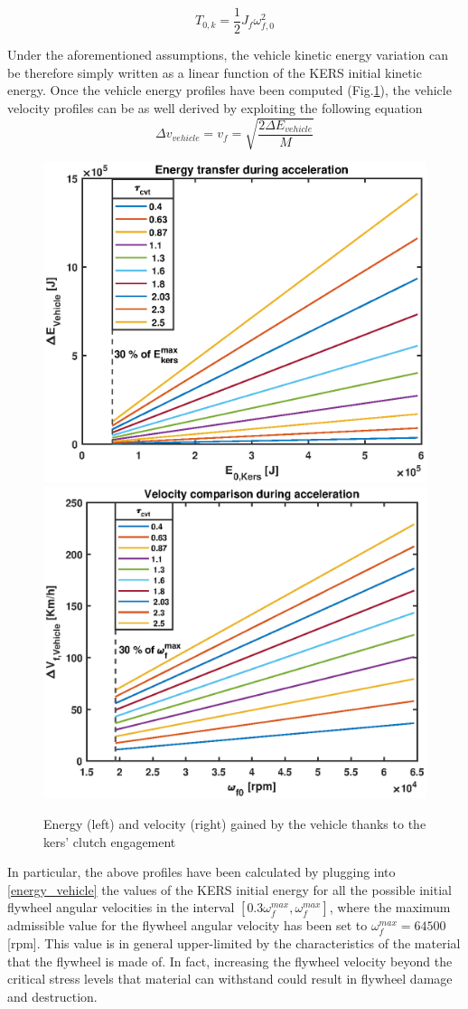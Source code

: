 \documentclass[11pt]{article}
\begin{document}
\begin{equation}
T_{0,k} = \frac{1}{2}J_f\omega_{f,0}^2
\end{equation}

Under the aforementioned assumptions, the vehicle kinetic energy variation can be therefore simply written as a linear function of the KERS initial kinetic energy. Once the vehicle energy profiles have been computed (Fig.\ref{en_comp_acc}), the vehicle velocity profiles can be as well derived by exploiting the following equation
\begin{equation}
\Delta v_{vehicle} = v_f = \sqrt{\frac{2\Delta E_{vehicle}}{M}}
\end{equation}

\begin{figure}[H]
\captionsetup{font=small, justification=centering}
\centering
\includegraphics[width=.49\textwidth]{Images/Results_new/Univariate_SteadyState/en_comp_acc.eps}\hfill
\includegraphics[width=.49\textwidth]{Images/Results_new/Univariate_SteadyState/vel_comp_acc.eps}
\caption{Energy (left) and velocity (right) gained by the vehicle thanks to the kers' clutch engagement}
\label{en_comp_acc}
\end{figure}

In particular, the above profiles have been calculated by plugging into \eqref{energy_vehicle} the values of the KERS initial energy for all the possible initial flywheel angular velocities in the interval $[0.3 \omega_f^{max}, \omega_f^{max}]$, where the maximum admissible value for the flywheel angular velocity has been set to $\omega_f^{max}=64500$ [rpm]. This value is in general upper-limited by the characteristics of the material that the flywheel is made of. In fact, increasing the flywheel velocity beyond the critical stress levels that material can withstand could result in flywheel damage and destruction.
\end{document}
